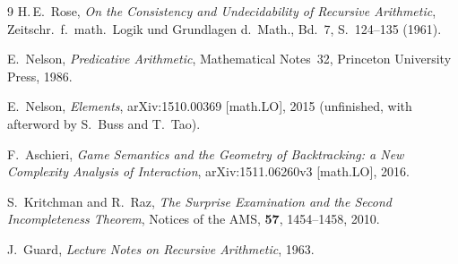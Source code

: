 \documentclass[11pt]{article}
\begin{document}
\begin{thebibliography}{9}
 H.\,E.\ Rose,
\emph{On the Consistency and Undecidability of Recursive Arithmetic},
Zeitschr.\ f.\ math.\ Logik und Grundlagen d.\ Math., Bd.~7, S.~124--135 (1961).

 E.\ Nelson,
\emph{Predicative Arithmetic},
Mathematical Notes~32, Princeton University Press, 1986.

 E.\ Nelson,
\emph{Elements},
arXiv:1510.00369 [math.LO], 2015 (unfinished, with afterword by S.\ Buss and T.\ Tao).

 F.\ Aschieri,
\emph{Game Semantics and the Geometry of Backtracking: a New Complexity
Analysis of Interaction},
arXiv:1511.06260v3 [math.LO], 2016.

 S.\ Kritchman and R.\ Raz,
\emph{The Surprise Examination and the Second Incompleteness Theorem},
Notices of the AMS, \textbf{57}, 1454--1458, 2010.

 J.\ Guard,
\emph{Lecture Notes on Recursive Arithmetic}, 1963.
\end{thebibliography}
\end{document}
